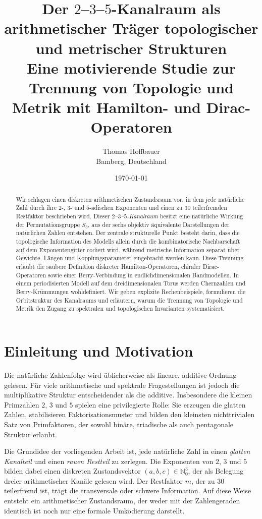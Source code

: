 \documentclass[11pt,a4paper]{article}
\title{Der $2$--$3$--$5$-Kanalraum als arithmetischer Träger topologischer und metrischer Strukturen\\
	\large Eine motivierende Studie zur Trennung von Topologie und Metrik mit Hamilton- und Dirac-Operatoren}
\author{Thomas Hoffbauer\\Bamberg, Deutschland}
\date{\today}
\theoremstyle{remark}
\newcommand{\N}{\mathbb{N}}
\begin{document}
	\maketitle
	
	\begin{abstract}
		Wir schlagen einen diskreten arithmetischen Zustandsraum vor, in dem jede natürliche Zahl durch ihre $2$-, $3$- und $5$-adischen Exponenten und einen zu $30$ teilerfremden Restfaktor beschrieben wird. Dieser \emph{$2$--$3$--$5$-Kanalraum} besitzt eine natürliche Wirkung der Permutationsgruppe $S_3$, aus der sechs objektiv äquivalente Darstellungen der natürlichen Zahlen entstehen. Der zentrale strukturelle Punkt besteht darin, dass die topologische Information des Modells allein durch die kombinatorische Nachbarschaft auf dem Exponentengitter codiert wird, während metrische Information separat über Gewichte, Längen und Kopplungsparameter eingebracht werden kann. Diese Trennung erlaubt die saubere Definition diskreter Hamilton-Operatoren, chiraler Dirac-Operatoren sowie einer Berry-Verbindung in endlichdimensionalen Bandmodellen. In einem periodisierten Modell auf dem dreidimensionalen Torus werden Chernzahlen und Berry-Krümmungen wohldefiniert. Wir geben explizite Rechenbeispiele, formulieren die Orbitstruktur des Kanalraums und erläutern, warum die Trennung von Topologie und Metrik den Zugang zu spektralen und topologischen Invarianten systematisiert.
	\end{abstract}
	
	\section{Einleitung und Motivation}
	
	Die natürliche Zahlenfolge wird üblicherweise als lineare, additive Ordnung gelesen. Für viele arithmetische und spektrale Fragestellungen ist jedoch die multiplikative Struktur entscheidender als die additive. Insbesondere die kleinen Primzahlen $2$, $3$ und $5$ spielen eine privilegierte Rolle: Sie erzeugen die glatten Zahlen, stabilisieren Faktorisationsmuster und bilden den kleinsten nichttrivialen Satz von Primfaktoren, der sowohl binäre, triadische als auch pentagonale Struktur erlaubt.
	
	Die Grundidee der vorliegenden Arbeit ist, jede natürliche Zahl in einen \emph{glatten Kanalteil} und einen \emph{rauen Restteil} zu zerlegen. Die Exponenten von $2$, $3$ und $5$ bilden dabei einen diskreten Zustandsvektor $(a,b,c)\in\N_0^3$, der als Belegung dreier arithmetischer Kanäle gelesen wird. Der Restfaktor $m$, der zu $30$ teilerfremd ist, trägt die transversale oder schwere Information. Auf diese Weise entsteht ein arithmetischer Zustandsraum, der weder mit der Zahlengeraden identisch ist noch nur eine formale Umkodierung darstellt.
	
\end{document}
